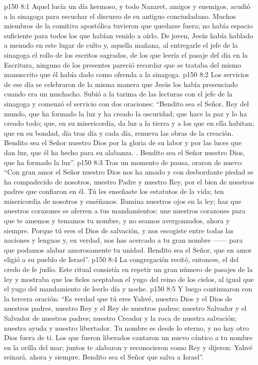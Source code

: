 \vs p150 8:1 Aquel  lucía un día hermoso, y todo Nazaret, amigos y enemigos, acudió a la sinagoga para escuchar el discurso de su antiguo conciudadano. Muchos miembros de la comitiva apostólica tuvieron que quedarse fuera; no había espacio suficiente para todos los que habían venido a oírlo. De joven, Jesús había hablado a menudo en este lugar de culto y, aquella mañana, al entregarle el jefe de la sinagoga el rollo de los escritos sagrados, de los que leería el pasaje del día en la Escritura, ninguno de los presentes pareció recordar que se trataba del mismo manuscrito que él había dado como ofrenda a la sinagoga.
\vs p150 8:2 Los servicios de ese día se celebraron de la misma manera que Jesús los había presenciado cuando era un muchacho. Subió a la tarima de las lecturas con el jefe de la sinagoga y comenzó el servicio con dos oraciones: “Bendito sea el Señor, Rey del mundo, que ha formado la luz y ha creado la oscuridad; que hace la paz y lo ha creado todo; que, en su misericordia, da luz a la tierra y a los que en ella habitan; que en su bondad, día tras día y cada día, renueva las obras de la creación. Bendito sea el Señor nuestro Dios por la gloria de su labor y por las luces que dan luz, que él ha hecho para su alabanza. . Bendito sea el Señor nuestro Dios, que ha formado la luz”.
\vs p150 8:3 Tras un momento de pausa, oraron de nuevo: “Con gran amor el Señor nuestro Dios nos ha amado y con desbordante piedad se ha compadecido de nosotros, nuestro Padre y nuestro Rey, por el bien de nuestros padres que confiaron en él. Tú les enseñaste los estatutos de la vida; ten misericordia de nosotros y enséñanos. Ilumina nuestros ojos en la ley; haz que nuestros corazones se aferren a tus mandamientos; une nuestros corazones para que te amemos y temamos tu nombre, y no seamos avergonzados, ahora y siempre. Porque tú eres el Dios de salvación, y nos escogiste entre todas las naciones y lenguas y, en verdad, nos has acercado a tu gran nombre ------ para que podamos alabar amorosamente tu unidad. Bendito sea el Señor, que en amor eligió a su pueblo de Israel”.
\vs p150 8:4 La congregación recitó, entonces, el  del credo de fe judío. Este ritual consistía en repetir un gran número de pasajes de la ley y mostraba que los fieles aceptaban el yugo del reino de los cielos, al igual que el yugo del mandamiento de leerlo día y noche.
\vs p150 8:5 Y luego continuaron con la tercera oración: “Es verdad que tú eres Yahvé, nuestro Dios y el Dios de nuestros padres, nuestro Rey y el Rey de nuestros padres; nuestro Salvador y el Salvador de nuestros padres; nuestro Creador y la roca de nuestra salvación; nuestra ayuda y nuestro libertador. Tu nombre es desde lo eterno, y no hay otro Dios fuera de ti. Los que fueron liberados cantaron un nuevo cántico a tu nombre en la orilla del mar; juntos te alabaron y reconocieron como Rey y dijeron: Yahvé reinará, ahora y siempre. Bendito sea el Señor que salva a Israel”.
